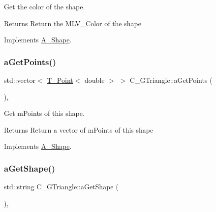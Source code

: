 Get the color of the shape. 

\begin{DoxyReturn}{Returns}
Return the M\+L\+V\+\_\+\+Color of the shape 
\end{DoxyReturn}


Implements \hyperlink{classA__Shape_a1e90c8132d33e4ac84d42f72606193b2}{A\+\_\+\+Shape}.

\mbox{\label{classC__GTriangle_af3c514a6f5516c297374004a94788877}} 
\subsubsection{\texorpdfstring{a\+Get\+Points()}{aGetPoints()}}
{\footnotesize\ttfamily std\+::vector$<$ \hyperlink{classT__Point}{T\+\_\+\+Point}$<$ double $>$ $>$ C\+\_\+\+G\+Triangle\+::a\+Get\+Points (\begin{DoxyParamCaption}{ }\end{DoxyParamCaption})\hspace{0.3cm}{\ttfamily [override]}, {\ttfamily [virtual]}}



Get m\+Points of this shape. 

\begin{DoxyReturn}{Returns}
Return a vector of m\+Points of this shape 
\end{DoxyReturn}


Implements \hyperlink{classA__Shape_a9fd1285bd63b1fc88943c9969bf01a5c}{A\+\_\+\+Shape}.

\mbox{\label{classC__GTriangle_a039e79bb17dae01997b11243de457d98}} 
\subsubsection{\texorpdfstring{a\+Get\+Shape()}{aGetShape()}}
{\footnotesize\ttfamily std\+::string C\+\_\+\+G\+Triangle\+::a\+Get\+Shape (\begin{DoxyParamCaption}{ }\end{DoxyParamCaption})\hspace{0.3cm}{\ttfamily [override]}, {\ttfamily [virtual]}}



